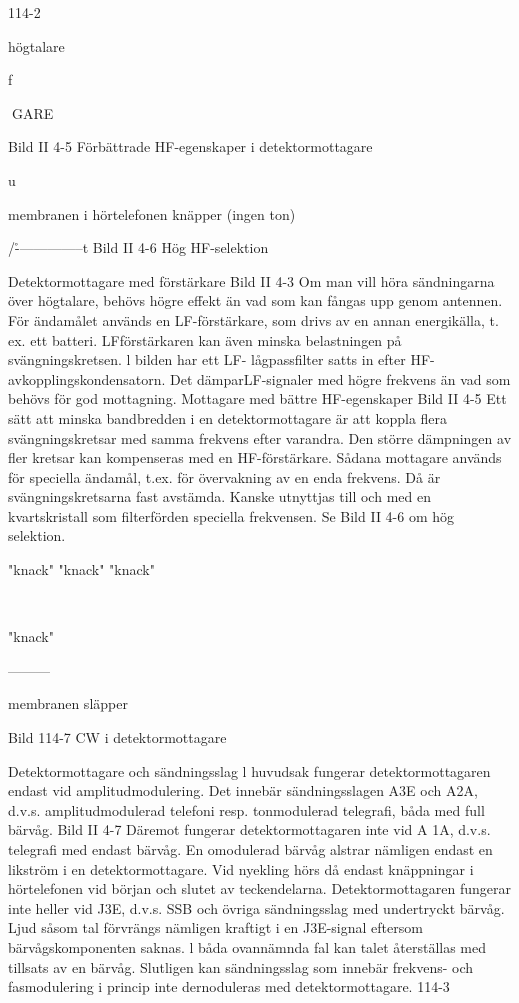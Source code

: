 \documentclass[a4paper,twoside,twocolumn,openright]{book}
\begin{document}
{{{114-2

högtalare

f

GARE

Bild II 4-5 Förbättrade HF-egenskaper i detektormottagare

u

membranen i hörtelefonen knäpper
(ingen ton)

/\r---------------t
Bild II 4-6 Hög HF-selektion

Detektormottagare med förstärkare
Bild II 4-3
Om man vill höra sändningarna över högtalare, behövs högre effekt än vad som kan
fångas upp genom antennen. För ändamålet används en LF-förstärkare, som drivs av
en annan energikälla, t. ex. ett batteri. LFförstärkaren kan även minska belastningen
på svängningskretsen.
l bilden har ett LF- lågpassfilter satts in
efter HF-avkopplingskondensatorn. Det
dämparLF-signaler med högre frekvens än
vad som behövs för god mottagning.
Mottagare med bättre HF-egenskaper
Bild II 4-5
Ett sätt att minska bandbredden i en detektormottagare är att koppla flera svängningskretsar med samma frekvens efter varandra. Den större dämpningen av fler kretsar
kan kompenseras med en HF-förstärkare.
Sådana mottagare används för speciella
ändamål, t.ex. för övervakning av en enda
frekvens. Då är svängningskretsarna fast
avstämda. Kanske utnyttjas till och med en
kvartskristall som filterförden speciella frekvensen. Se Bild II 4-6 om hög selektion.

"knack" "knack" "knack"

\

"knack"

---------

membranen släpper

Bild 114-7 CW i detektormottagare

Detektormottagare och sändningsslag
l huvudsak fungerar detektormottagaren endast vid amplitudmodulering. Det innebär
sändningsslagen A3E och A2A, d.v.s. amplitudmodulerad telefoni resp. tonmodulerad
telegrafi, båda med full bärvåg.
Bild II 4-7 Däremot fungerar detektormottagaren inte vid A 1A, d.v.s. telegrafi med
endast bärvåg. En omodulerad bärvåg alstrar nämligen endast en likström i en
detektormottagare. Vid nyekling hörs då
endast knäppningar i hörtelefonen vid början och slutet av teckendelarna.
Detektormottagaren fungerar inte heller
vid J3E, d.v.s. SSB och övriga sändningsslag med undertryckt bärvåg. Ljud såsom tal
förvrängs nämligen kraftigt i en J3E-signal
eftersom bärvågskomponenten saknas.
l båda ovannämnda fal kan talet återställas med tillsats av en bärvåg.
Slutligen kan sändningsslag som innebär frekvens- och fasmodulering i princip
inte dernoduleras med detektormottagare.
114-3

}}}
\end{document}
